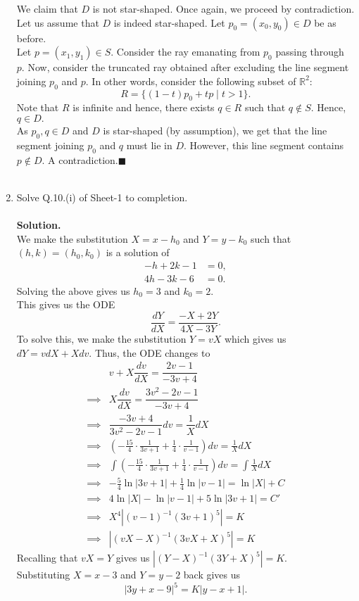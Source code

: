 \documentclass{article}
\begin{document}
\begin{enumerate}[label = Q.\arabic*.]
	We claim that $D$ is not star-shaped. Once again, we proceed by contradiction.\\
	Let us assume that $D$ is indeed star-shaped. Let $p_0 = (x_0, y_0) \in D$ be as before.\\
	Let $p = (x_1, y_1) \in S.$ Consider the ray emanating from $p_0$ passing through $p.$ Now, consider the truncated ray obtained after excluding the line segment joining $p_0$ and $p.$ In other words, consider the following subset of $\mathbb{R}^2:$
	\[R = \{(1 - t)p_0 + tp \mid t > 1\}.\]
	Note that $R$ is infinite and hence, there exists $q \in R$ such that $q \notin S.$ Hence, $q \in D.$\\
	As $p_0, q \in D$ and $D$ is star-shaped (by assumption), we get that the line segment joining $p_0$ and $q$ must lie in $D.$ However, this line segment contains $p \notin D.$ A contradiction.\hfill $\blacksquare$\\\\
	\item Solve Q.10.(i) of Sheet-1 to completion.\\\\
	\textbf{Solution.}\\
	We make the substitution $X = x - h_0$ and $Y = y - k_0$ such that $(h, k) = (h_0, k_0)$ is a solution of
	\begin{align*} 
		-h + 2k - 1 &= 0,\\
		4h - 3k - 6 &= 0.
	\end{align*}
	Solving the above gives us $h_0 = 3$ and $k_0 = 2.$\\
	This gives us the ODE
	\[\dfrac{dY}{dX} = \dfrac{-X + 2Y}{4X - 3Y}.\]
	To solve this, we make the substitution $Y = vX$ which gives us $dY = vdX + Xdv.$ Thus, the ODE changes to
	\begin{align*} 
		& v + X\dfrac{dv}{dX} = \dfrac{2v - 1}{-3v + 4}\\
		\implies & X\dfrac{dv}{dX} = \dfrac{3v^2 -2v - 1}{-3v + 4}\\
		\implies & \dfrac{-3v + 4}{3v^2 - 2v - 1}dv = \dfrac{1}{X}dX\\
		\implies & \left(-\frac{15}{4}\cdot\frac{1}{3v + 1} + \frac{1}{4}\cdot\frac{1}{v - 1}\right)dv = \frac{1}{X}dX\\
		\implies & \int\left(-\frac{15}{4}\cdot\frac{1}{3v + 1} + \frac{1}{4}\cdot\frac{1}{v - 1}\right)dv = \int\frac{1}{X}dX\\
		\implies & -\frac{5}{4}\ln|3v + 1| + \frac{1}{4}\ln|v - 1| = \ln|X| + C\\
		\implies & 4\ln|X| - \ln|v - 1| + 5\ln|3v +  1| = C'\\
		\implies & X^4|(v - 1)^{-1}(3v + 1)^5| = K\\
		\implies & |(vX - X)^{-1}(3vX + X)^5| = K
	\end{align*}
	Recalling that $vX = Y$ gives us $|(Y - X)^{-1}(3Y + X)^5| = K.$\\
	Substituting $X = x - 3$ and $Y = y - 2$ back gives us
	\[|3y + x - 9|^5 = K |y - x + 1|.\]
\end{enumerate}
\end{document}
